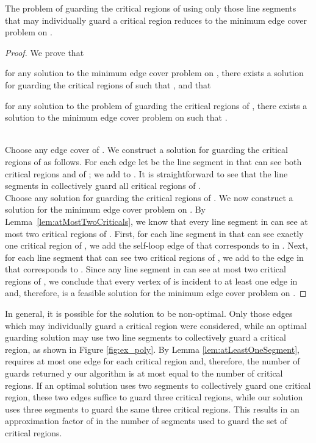 \documentclass{llncs}
\begin{document}
\begin{lemma}
\label{lem:criticalEdgeCoverEquivalence}
The problem of guarding the critical regions of  using only those line segments that may individually guard a critical region reduces to the minimum edge cover problem on .
\end{lemma}
\begin{proof}
We prove that \begin{inparaenum}[(i)]\item for any solution  to the minimum edge cover
problem on , there exists a solution  for guarding the critical regions of  such
that , and that \item for any solution  to the problem of guarding
the critical regions of , there exists a solution  to the minimum edge cover problem on
 such that . \end{inparaenum}\\

 Choose any edge cover  of . We construct a solution  for guarding the critical regions of  as follows. For each edge
 let  be the line segment in  that can see both critical
regions  and  of ; we add  to . It is straightforward to see that
the line segments in  collectively guard all critical regions of .\\

 Choose any solution  for guarding the critical regions of . We
now construct a solution  for the minimum edge cover problem on . By Lemma~\ref{lem:atMostTwoCriticals},
we know that every line segment in  can see at most two critical regions of .
First, for each line segment in  that can see exactly one critical region  of , we add the
self-loop edge of  that corresponds to  in . Next, for each line segment  that
can see two critical regions of , we add to  the edge in  that corresponds to .
Since any line segment in  can see at most two critical regions of , we conclude that every
vertex of  is incident to at least one edge in  and, therefore,  is a feasible solution for
the minimum edge cover problem on .
\end{proof}

In general, it is possible for the solution  to be non-optimal. Only those edges which may individually guard a critical region were considered, while an optimal guarding solution may use two line segments to collectively guard a critical region, as shown in Figure \ref{fig:ex_poly}. By Lemma \ref{lem:atLeastOneSegment},  requires at most one edge for each critical region and,
therefore, the number of guards returned y our algorithm is at most equal to the number of critical regions.
If an optimal solution uses two segments to collectively guard one critical region, 
these two edges suffice to guard three critical regions, while our solution uses three segments to guard the same three
critical regions. This results in an approximation factor of  in the number of segments used to guard 
the set of critical regions.
\end{document}
